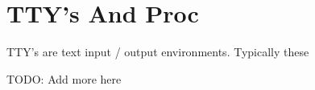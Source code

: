 
\section{TTY's And Proc}
TTY's are text input / output environments. Typically these 

TODO: Add more here
